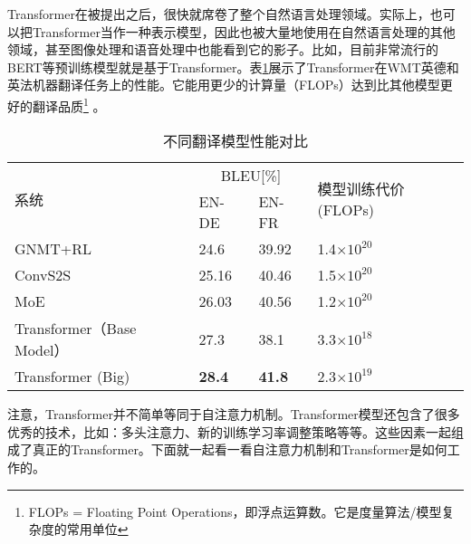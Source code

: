 \parinterval Transformer在被提出之后，很快就席卷了整个自然语言处理领域。实际上，也可以把Transformer当作一种表示模型，因此也被大量地使用在自然语言处理的其他领域，甚至图像处理和语音处理中也能看到它的影子。比如，目前非常流行的BERT等预训练模型就是基于Transformer。表\ref{tab:12-2}展示了Transformer在WMT英德和英法机器翻译任务上的性能。它能用更少的计算量（FLOPs）达到比其他模型更好的翻译品质\footnote{FLOPs = Floating Point Operations，即浮点运算数。它是度量算法/模型复杂度的常用单位} 。

\begin{table}[htp]
\centering
\caption{ 不同翻译模型性能对比}
\label{tab:12-2}
\begin{tabular}{l l l l}
\multicolumn{1}{l|}{\multirow{2}{*}{系统}} & \multicolumn{2}{c}{BLEU[\%]} & \multirow{2}{*}{\parbox{6em}{模型训练代价 (FLOPs)}} \\
\multicolumn{1}{l|}{}                    & EN-DE  & EN-FR  &                                       \\ \hline
\multicolumn{1}{l|}{GNMT+RL}             & 24.6            & 39.92           & 1.4$\times 10^{20}$                   \\
\multicolumn{1}{l|}{ConvS2S}             & 25.16           & 40.46           & 1.5$\times 10^{20}$                   \\
\multicolumn{1}{l|}{MoE}                 & 26.03           & 40.56           & 1.2$\times 10^{20}$                   \\
\multicolumn{1}{l|}{Transformer（Base Model）}                 & 27.3           &38.1           & 3.3$\times 10^{18}$                   \\
\multicolumn{1}{l|}{Transformer (Big)}    & {\small\sffamily\bfseries{28.4}}   & {\small\sffamily\bfseries{41.8}}   & 2.3$\times 10^{19}$                   \\
\end{tabular}
\end{table}

\parinterval 注意，Transformer并不简单等同于自注意力机制。Transformer模型还包含了很多优秀的技术，比如：多头注意力、新的训练学习率调整策略等等。这些因素一起组成了真正的Transformer。下面就一起看一看自注意力机制和Transformer是如何工作的。



